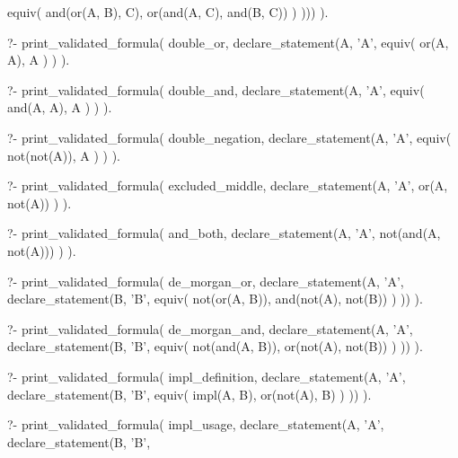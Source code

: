 \begin{fact}
\begin{prolog}
		equiv(
			and(or(A, B), C),
			or(and(A, C), and(B, C))
		)
	)))
).
\end{prolog}
\begin{prolog}
?- print_validated_formula(
	double_or,
	declare_statement(A, 'A',
		equiv(
			or(A, A),
			A
		)
	)
).
\end{prolog}
\begin{prolog}
?- print_validated_formula(
	double_and,
	declare_statement(A, 'A',
		equiv(
			and(A, A),
			A
		)
	)
).
\end{prolog}
\begin{prolog}
?- print_validated_formula(
	double_negation,
	declare_statement(A, 'A',
		equiv(
			not(not(A)),
			A
		)
	)
).
\end{prolog}
\begin{prolog}
?- print_validated_formula(
	excluded_middle,
	declare_statement(A, 'A',
		or(A, not(A))
	)
).
\end{prolog}
\begin{prolog}
?- print_validated_formula(
	and_both,
	declare_statement(A, 'A',
		not(and(A, not(A)))
	)
).
\end{prolog}
\begin{prolog}
?- print_validated_formula(
	de_morgan_or,
	declare_statement(A, 'A', declare_statement(B, 'B',
		equiv(
			not(or(A, B)),
			and(not(A), not(B))
		)
	))
).
\end{prolog}
\begin{prolog}
?- print_validated_formula(
	de_morgan_and,
	declare_statement(A, 'A', declare_statement(B, 'B',
		equiv(
			not(and(A, B)),
			or(not(A), not(B))
		)
	))
).
\end{prolog}
\begin{prolog}
?- print_validated_formula(
	impl_definition,
	declare_statement(A, 'A', declare_statement(B, 'B',
		equiv(
			impl(A, B),
			or(not(A), B)
		)
	))
).
\end{prolog}
\begin{prolog}
?- print_validated_formula(
	impl_usage,
	declare_statement(A, 'A', declare_statement(B, 'B',

\end{prolog}
\end{fact}

